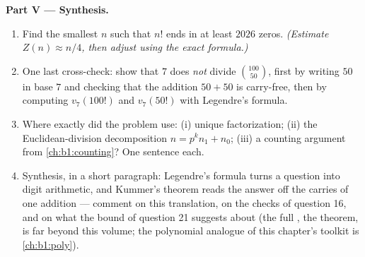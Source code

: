 \begin{problem}
\medskip
\noindent\textbf{Part V --- Synthesis.}
\begin{enumerate}[resume]
  \item Find the smallest $n$ such that $n!$ ends in at least
        $2026$ zeros. \emph{(Estimate $Z(n) \approx n/4$, then
        adjust using the exact formula.)}
  \item One last cross-check: show that $7$ does \emph{not} divide
        $\binom{100}{50}$, first by writing $50$ in base $7$ and
        checking that the addition $50 + 50$ is carry-free, then
        by computing $v_7(100!)$ and $v_7(50!)$ with Legendre's
        formula.
  \item Where exactly did the problem use: (i) unique
        factorization; (ii) the Euclidean-division decomposition
        $n = p^k n_1 + n_0$; (iii) a counting argument from
        \cref{ch:b1:counting}? One sentence each.
  \item Synthesis, in a short paragraph: Legendre's formula turns
        a  question into digit arithmetic, and
        Kummer's theorem reads the answer off the carries of one
        addition --- comment on this translation, on the checks of
        question 16, and on what the bound of question 21 suggests
        about  (the full , the 
        theorem, is far beyond this volume; the polynomial
        analogue of this chapter's toolkit is
        \cref{ch:b1:poly}).
\end{enumerate}
\end{problem}
